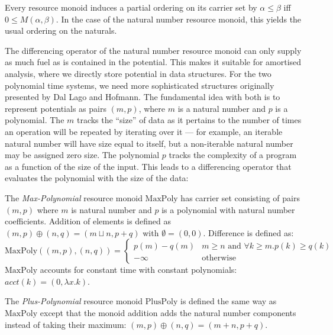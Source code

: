 \documentclass[acmsmall,review]{acmart}
\begin{document}
Every resource monoid induces a partial ordering on its carrier set by
$\alpha \leq \beta$ iff $0 \leq M(\alpha, \beta)$. In the case of the
natural number resource monoid, this yields the usual ordering on the
naturals.

\newcommand{\MaxPoly}{\mathrm{MaxPoly}}
\newcommand{\PlusPoly}{\mathrm{PlusPoly}}

The differencing operator of the natural number resource monoid can
only supply as much fuel as is contained in the potential. This makes
it suitable for amortised analysis, where we directly store potential
in data structures. For the two polynomial time systems, we need more
sophisticated structures originally presented by Dal Lago and
Hofmann. The fundamental idea with both is to represent potentials as
pairs $(m,p)$, where $m$ is a natural number and $p$ is a
polynomial. The $m$ tracks the ``size'' of data as it pertains to the
number of times an operation will be repeated by iterating over it ---
for example, an iterable natural number will have size equal to
itself, but a non-iterable natural number may be assigned zero
size. The polynomial $p$ tracks the complexity of a program as a
function of the size of the input. This leads to a differencing
operator that evaluates the polynomial with the size of the data:

\begin{definition}
  The \emph{Max-Polynomial} resource monoid $\MaxPoly$ has carrier
  set consisting of pairs $(m,p)$ where $m$ is natural number and $p$
  is a polynomial with natural number coefficients. Addition of
  elements is defined as $(m,p) \oplus (n,q) = (m \sqcup n, p+q)$ with
  $\emptyset = (0,0)$. Difference is defined as:
  \begin{displaymath}
    \MaxPoly((m,p),(n,q)) = \left\{
      \begin{array}{ll}
        p(m) - q(m)&m \geq n \textrm{ and } \forall k \geq m. p(k) \geq q(k) \\
        - \infty & \textrm{otherwise}
      \end{array}
    \right.
  \end{displaymath}
  $\MaxPoly$ accounts for constant time with constant polynomials:
  $\mathit{acct}(k) = (0,\lambda x.k)$.

  The \emph{Plus-Polynomial} resource monoid $\PlusPoly$ is defined
  the same way as $\MaxPoly$ except that the monoid addition adds the
  natural number components instead of taking their maximum:
  $(m,p) \oplus (n,q) = (m + n, p+q)$.
\end{definition}
\end{document}

